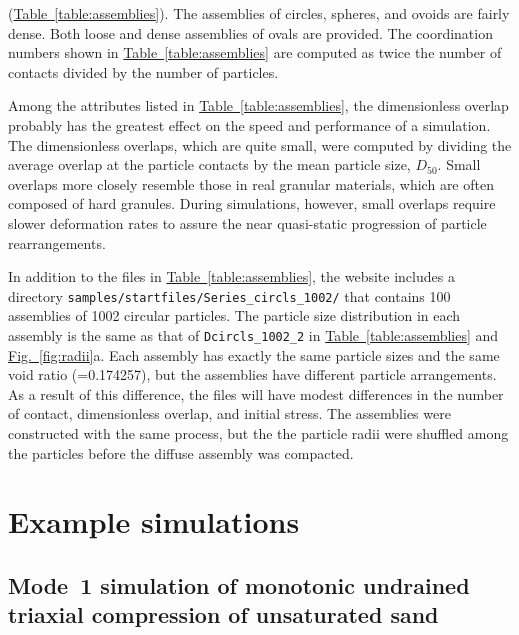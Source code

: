\documentclass[letterpaper,11pt]{article}
\begin{document}
(\hyperref[table:assemblies]{Table~\ref*{table:assemblies}}).
The assemblies of circles, spheres, and ovoids are fairly dense.
Both loose and dense assemblies of ovals are provided.
The coordination numbers shown in
\hyperref[table:assemblies]{Table~\ref*{table:assemblies}}
are computed as
twice the number of contacts divided by the number of particles.
\par
Among the attributes listed in
\hyperref[table:assemblies]{Table~\ref*{table:assemblies}},
the dimensionless overlap probably has the greatest effect on
the speed and performance of a simulation.
The dimensionless overlaps, which are quite small, were computed
by dividing the average overlap at the particle contacts by the
mean particle size, $D_{50}$.
Small overlaps more closely resemble those in real 
granular materials, which are often composed of hard granules.
During simulations, however, small overlaps
require slower deformation rates to assure the near quasi-static
progression of particle rearrangements.
\par
In addition to the files in
\hyperref[table:assemblies]{Table~\ref*{table:assemblies}},
the website includes a directory 
\texttt{samples/startfiles/Series\_circls\_1002/}
that contains 100 assemblies of 1002 circular particles.
The particle size distribution in each assembly is the same as that of
\texttt{Dcircls\_1002\_2} in
\hyperref[table:assemblies]{Table~\ref*{table:assemblies}}
and \hyperref[fig:radii]{Fig.~\ref*{fig:radii}}a.
Each assembly has exactly the same particle sizes and the same void 
ratio (=0.174257), but the assemblies have different particle arrangements.
As a result of this difference, the files will have modest differences
in the number of contact, dimensionless overlap, and initial stress.
The assemblies were constructed with the same process, but the
the particle radii were shuffled among the particles before
the diffuse assembly was compacted.
%
%
%
\section{Example simulations}\label{sec:examples}
%
\subsection{Mode~1 simulation of monotonic undrained triaxial compression of unsaturated sand}\label{sec:CIUCmono}
\end{document}
